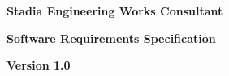\begin{titlepage}
\begin{center}
		\begin{LARGE}
			\bf{Stadia Engineering Works Consultant}
		\end{LARGE}
		\vspace*{30pt}
		
		{\large \textbf{Software Requirements Specification}}
		\vspace{1.5\baselineskip}	
		
		{\large \textbf{Version 1.0}}
		\vspace{3.5\baselineskip}
		
		
		\vspace{15pt}
	
	\end{center}
\end{titlepage}